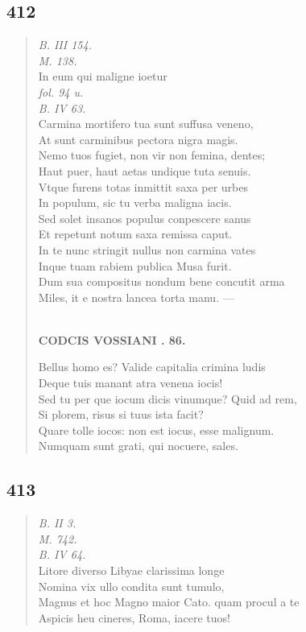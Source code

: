 \documentclass[11pt, a4paper]{report}
\begin{document}
            \subsection*{412}
      \begin{verse}
      \textit{B. III 154.} \\ \textit{M. 138.} \\ In eum qui maligne ioetur \\ \textit{fol. 94 u.} \\ \textit{B. IV 63.} \\ Carmina mortifero tua sunt suffusa veneno, \\ At sunt carminibus pectora nigra magis. \\ Nemo tuos fugiet, non vir non femina, dentes; \\ Haut puer, haut aetas undique tuta senuis. \\ Vtque furens totas inmittit saxa per urbes \\ In populum, sic tu verba maligna iacis. \\ Sed solet insanos populus conpescere sanus \\ Et repetunt notum saxa remissa caput. \\ In te nunc stringit nullus non carmina vates \\ Inque tuam rabiem publica Musa furit. \\ Dum sua compositus nondum bene concutit arma \\ Miles, it e nostra lancea torta manu. — \\ 
        ﻿\pagebreak 
    \begin{center} \textbf{CODCIS VOSSIANI . 86.} \end{center} \marginpar{[319]} Bellus homo es? Valide capitalia crimina ludis \\ Deque tuis manant atra venena iocis! \\ Sed tu per \lbrack que iocum dicis vinumque? Quid ad rem, \\ Si plorem, risus si tuus ista facit? \\ Quare tolle iocos: non est iocus, esse malignum. \\ Numquam sunt grati, qui nocuere, sales. \\ 
      \end{verse}
  
            \subsection*{413}
      \begin{verse}
      \textit{B. II 3.} \\ \textit{M. 742.} \\ \textit{B. IV 64.} \\ Litore diverso Libyae clarissima longe \\ Nomina vix ullo condita sunt tumulo, \\ Magnus et hoc Magno maior Cato. quam procul a te \\ Aspicis heu cineres, Roma, iacere tuos! \\ 
      \end{verse}
  
\end{document}
